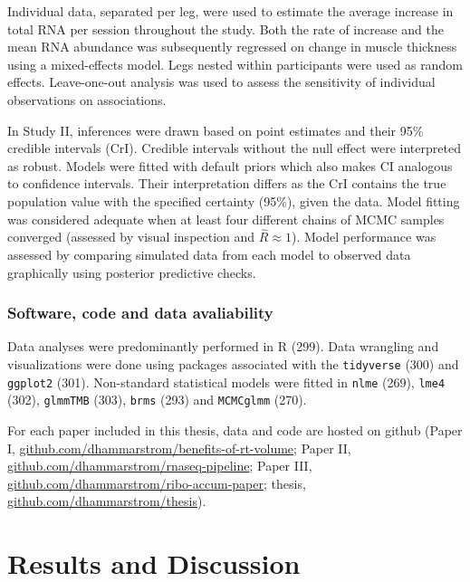 \documentclass[twoside,10pt]{gihclass} %
\begin{document}
Individual data, separated per leg, were used to estimate the average increase in total RNA per session throughout the study. Both the rate of increase and the mean RNA abundance was subsequently regressed on change in muscle thickness using a mixed-effects model. Legs nested within participants were used as random effects. Leave-one-out analysis was used to assess the sensitivity of individual observations on associations.

In Study II, inferences were drawn based on point estimates and their 95\% credible intervals (CrI). Credible intervals without the null effect were interpreted as robust. Models were fitted with default priors which also makes CI analogous to confidence intervals. Their interpretation differs as the CrI contains the true population value with the specified certainty (95\%), given the data. Model fitting was considered adequate when at least four different chains of MCMC samples converged (assessed by visual inspection and \(\hat{R}\approx 1\)). Model performance was assessed by comparing simulated data from each model to observed data graphically using posterior predictive checks.

\hypertarget{software-code-and-data-avaliability}{%
\subsection{Software, code and data avaliability}\label{software-code-and-data-avaliability}}

Data analyses were predominantly performed in R (299).
Data wrangling and visualizations were done using packages associated with the
\texttt{tidyverse} (300) and \texttt{ggplot2} (301).
Non-standard statistical models were fitted in
\texttt{nlme} (269),
\texttt{lme4} (302),
\texttt{glmmTMB} (303),
\texttt{brms} (293) and
\texttt{MCMCglmm} (270).

For each paper included in this thesis, data and code are hosted on github (Paper I, \href{https://github.com/dhammarstrom/benefits-of-rt-volume}{github.com/dhammarstrom/benefits-of-rt-volume}; Paper II, \href{https://github.com/dhammarstrom/rnaseq-pipeline}{github.com/dhammarstrom/rnaseq-pipeline};
Paper III, \href{https://github.com/dhammarstrom/ribo-accum-paper}{github.com/dhammarstrom/ribo-accum-paper};
thesis, \href{https://github.com/dhammarstrom/thesis}{github.com/dhammarstrom/thesis}).

\hypertarget{results-and-discussion}{%
\chapter{Results and Discussion}\label{results-and-discussion}}
\end{document}
